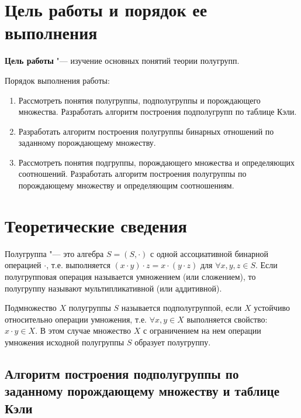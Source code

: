 \documentclass[bachelor, och, labwork]{shiza}
\begin{document}



\tableofcontents

\section{\textbf{Цель работы и порядок ее выполнения}}

\textbf{Цель работы} "--- изучение основных понятий теории полугрупп.

Порядок выполнения работы:

\begin{enumerate}
    \item Рассмотреть понятия полугруппы, подполугруппы и порождающего
    множества. Разработать алгоритм построения подполугрупп по таблице Кэли.
    \item Разработать алгоритм построения полугруппы бинарных отношений по
    заданному порождающему множеству.
    \item Рассмотреть понятия подгруппы, порождающего множества и
    определяющих соотношений. Разработать алгоритм построения полугруппы по
    порождающему множеству  и определяющим соотношениям.
\end{enumerate}

\section{Теоретические сведения}


Полугруппа "--- это алгебра $S = (S, \cdot)$ с одной
ассоциативной бинарной операцией $\cdot$, т.е. выполняется $(x \cdot y)
\cdot z = x \cdot (y \cdot z)$ для $\forall x, y, z \in S$. Если
полугрупповая операция называется умножением (или сложением), то полугруппу
называют мультипликативной (или аддитивной).

Подмножество $X$ полугруппы $S$ называется
подполугруппой, если $X$ устойчиво относительно операции умножения, т.е.
$\forall x, y \in X$ выполняется свойство: $x \cdot y \in X$. В этом случае
множество $X$ с ограничением на нем операции умножения исходной полугруппы
$S$ образует полугруппу.

\subsection{Алгоритм построения подполугруппы по заданному порождающему множеству и таблице Кэли}
\end{document}
